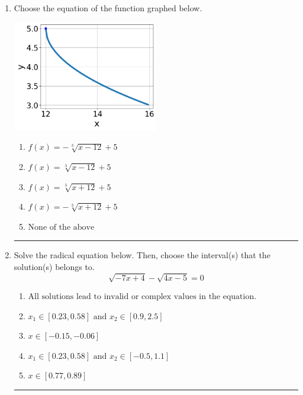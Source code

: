 \documentclass[14pt]{extbook}
\newcommand{\litem}[1]{\item#1\hspace*{-1cm}\rule{\textwidth}{0.4pt}}
\begin{document}
\begin{enumerate}
{\begin{enumerate}[label=\Alph*.]
\end{enumerate} }
\litem{
Choose the equation of the function graphed below.
\begin{center}
    \includegraphics[width=0.5\textwidth]{../Figures/radicalGraphToEquationB.png}
\end{center}
\begin{enumerate}[label=\Alph*.]
\item \( f(x) = - \sqrt[3]{x - 12} + 5 \)
\item \( f(x) = \sqrt[3]{x - 12} + 5 \)
\item \( f(x) = \sqrt[3]{x + 12} + 5 \)
\item \( f(x) = - \sqrt[3]{x + 12} + 5 \)
\item \( \text{None of the above} \)

\end{enumerate} }
\litem{
Solve the radical equation below. Then, choose the interval(s) that the solution(s) belongs to.\[ \sqrt{-7 x + 4} - \sqrt{4 x - 5} = 0 \]\begin{enumerate}[label=\Alph*.]
\item \( \text{All solutions lead to invalid or complex values in the equation.} \)
\item \( x_1 \in [0.23, 0.58] \text{ and } x_2 \in [0.9,2.5] \)
\item \( x \in [-0.15,-0.06] \)
\item \( x_1 \in [0.23, 0.58] \text{ and } x_2 \in [-0.5,1.1] \)
\item \( x \in [0.77,0.89] \)


\end{enumerate}}
\end{enumerate}
\end{document}
